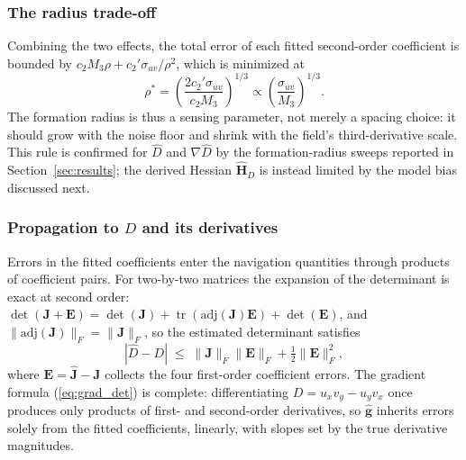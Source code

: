 \documentclass[lettersize,journal]{IEEEtran}
\begin{document}
\subsubsection{The radius trade-off}
Combining the two effects, the total error of each fitted second-order
coefficient is bounded by
$c_2 M_3 \rho + c_2' \sigma_{uv}/\rho^2$, which is minimized at
\begin{equation}
    \rho^* = \left(\frac{2 c_2' \sigma_{uv}}{c_2 M_3}\right)^{1/3}
    \propto \left(\frac{\sigma_{uv}}{M_3}\right)^{1/3}.
    \label{eq:rho_star}
\end{equation}
The formation radius is thus a sensing parameter, not merely a spacing
choice: it should grow with the noise floor and shrink with the field's
third-derivative scale. This rule is confirmed for $\hat{D}$ and
$\nabla\hat{D}$ by the formation-radius sweeps reported in
Section~\ref{sec:results}; the derived Hessian $\hat{\mathbf{H}}_D$ is
instead limited by the model bias discussed next.

\subsubsection{Propagation to $D$ and its derivatives}
Errors in the fitted coefficients enter the navigation quantities through
products of coefficient pairs. For two-by-two matrices the expansion of
the determinant is exact at second order:
$\det(\mathbf{J} + \mathbf{E}) = \det(\mathbf{J}) +
\operatorname{tr}(\mathrm{adj}(\mathbf{J})\mathbf{E}) + \det(\mathbf{E})$,
and $\|\mathrm{adj}(\mathbf{J})\|_F = \|\mathbf{J}\|_F$, so the estimated
determinant satisfies
\begin{equation}
    |\hat{D} - D| \;\leq\; \|\mathbf{J}\|_F \|\mathbf{E}\|_F
    + \tfrac{1}{2}\|\mathbf{E}\|_F^2,
    \label{eq:det_perturbation}
\end{equation}
where $\mathbf{E} = \hat{\mathbf{J}} - \mathbf{J}$ collects the four
first-order coefficient errors. The gradient formula (\ref{eq:grad_det})
is complete: differentiating $D = u_x v_y - u_y v_x$ once produces only
products of first- and second-order derivatives, so $\hat{\mathbf{g}}$
inherits errors solely from the fitted coefficients, linearly, with
slopes set by the true derivative magnitudes.
\end{document}
